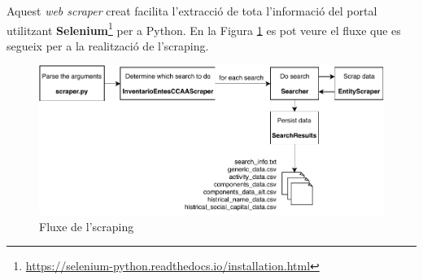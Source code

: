 \documentclass[12pt]{article}
\begin{document}
Aquest \textit{web scraper} creat facilita l'extracció de tota l'informació del portal utilitzant \textbf{Selenium}\footnote{\url{https://selenium-python.readthedocs.io/installation.html}} per a Python. En la Figura \ref{flowchart} es pot veure el fluxe que es segueix per a la realització de l'scraping.

\begin{figure}[H]
    \centering
    \includegraphics[width=1\columnwidth]{img/flowchart.pdf}
    \caption{Fluxe de l'scraping} 
    \label{flowchart}
\end{figure}
\end{document}
